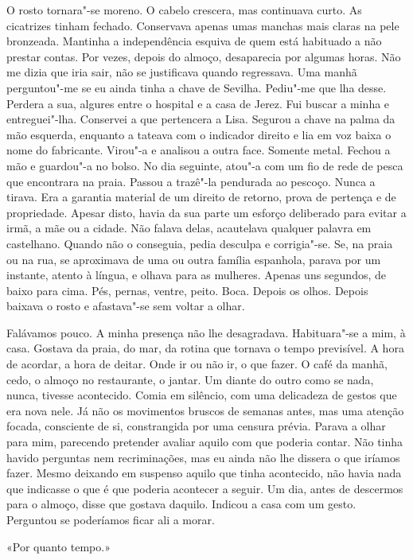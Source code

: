 O rosto tornara"-se moreno. O cabelo crescera, mas continuava curto. As
cicatrizes tinham fechado. Conservava apenas umas manchas mais claras na
pele bronzeada. Mantinha a independência esquiva de quem está habituado
a não prestar contas. Por vezes, depois do almoço, desaparecia por
algumas horas. Não me dizia que iria sair, não se justificava quando
regressava. Uma manhã perguntou"-me se eu ainda tinha a chave de
Sevilha. Pediu"-me que lha desse. Perdera a sua, algures entre o
hospital e a casa de Jerez. Fui buscar a minha e entreguei"-lha.
Conservei a que pertencera a Lisa. Segurou a chave na palma da mão
esquerda, enquanto a tateava com o indicador direito e lia em voz baixa
o nome do fabricante. Virou"-a e analisou a outra face. Somente metal.
Fechou a mão e guardou"-a no bolso. No dia seguinte, atou"-a com um fio
de rede de pesca que encontrara na praia. Passou a trazê"-la pendurada
ao pescoço. Nunca a tirava. Era a garantia material de um direito de
retorno, prova de pertença e de propriedade. Apesar disto, havia da sua
parte um esforço deliberado para evitar a irmã, a mãe ou a cidade. Não
falava delas, acautelava qualquer palavra em castelhano. Quando não o
conseguia, pedia desculpa e corrigia"-se. Se, na praia ou na rua, se
aproximava de uma ou outra família espanhola, parava por um instante,
atento à língua, e olhava para as mulheres. Apenas uns segundos, de
baixo para cima. Pés, pernas, ventre, peito. Boca. Depois os olhos.
Depois baixava o rosto e afastava"-se sem voltar a olhar.

Falávamos pouco. A minha presença não lhe desagradava. Habituara"-se a
mim, à casa. Gostava da praia, do mar, da rotina que tornava o tempo
previsível. A hora de acordar, a hora de deitar. Onde ir ou não ir, o
que fazer. O café da manhã, cedo, o almoço no restaurante, o jantar.
Um diante do outro como se nada, nunca, tivesse acontecido. Comia em
silêncio, com uma delicadeza de gestos que era nova nele. Já não os
movimentos bruscos de semanas antes, mas uma atenção focada, consciente
de si, constrangida por uma censura prévia. Parava a olhar para mim,
parecendo pretender avaliar aquilo com que poderia contar. Não tinha
havido perguntas nem recriminações, mas eu ainda não lhe dissera o que
iríamos fazer. Mesmo deixando em suspenso aquilo que tinha acontecido,
não havia nada que indicasse o que é que poderia acontecer a seguir. Um
dia, antes de descermos para o almoço, disse que gostava daquilo.
Indicou a casa com um gesto. Perguntou se poderíamos ficar ali a morar.

«Por quanto tempo.»

